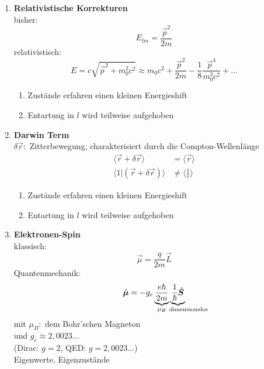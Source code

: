 \begin{enumerate}[1)]
	\item \textbf{Relativistische Korrekturen}\\
	bisher:
	\begin{equation*}
	E_{lm} = \frac{\vec{p}^2}{2m}
	\end{equation*}
	relativistisch:
	\begin{equation*}
	E = c \sqrt{\vec{p}^2 + m_0^2 c^2} \approx m_0 c^2 + \frac{\vec{p}^2}{2m} - \frac{1}{8} \frac{\vec{p}^4}{m_0^3 c^2} + \dots
	\end{equation*}
	\begin{enumerate}[$ \Rightarrow $]
		\item Zustände erfahren einen kleinen Energieshift
		\item Entartung in $ l $ wird teilweise aufgehoben
	\end{enumerate}
	\item \textbf{Darwin Term}\\
	$ \delta \vec{r} : $ Zitterbewegung, charakterisiert durch die Compton-Wellenlänge
	\begin{align*}
	\langle \vec{r} + \delta \vec{r} \rangle &= \langle \vec{r} \rangle \\
	\langle 1 | (\vec{r} + \delta \vec{r}) \rangle &\neq \langle \frac{1}{r} \rangle
	\end{align*}
	\begin{enumerate}[$ \Rightarrow $]
		\item Zustände erfahren einen kleinen Energieshift
		\item Entartung in $ l $ wird teilweise aufgehoben
	\end{enumerate}
	\item \textbf{Elektronen-Spin}\\
	klassisch:
	\begin{equation*}
	\vec{\mu} = \frac{q}{2m} \vec{L}
	\end{equation*}
	Quantenmechanik:
	\begin{equation*}
	\hat{\vec{\mu}} = - g_e \ub{\frac{e \hbar}{2m}}_{\mu_{B}} \ub{\frac{1}{\hbar} \hat{\vec{S}}}_{\mathclap{ \qquad \ \ \tx{dimensionslos}}}
	\end{equation*}
	mit $ \mu_B : $ dem Bohr'schen Magneton\\
	und $ g_e \approx 2{,}0023 \dots $\\
	(Dirac: $ g = 2 $, QED: $ g = 2{,}0023 \dots $)\\[5pt]
	Eigenwerte, Eigenzustände
	\begin{align*}

\end{align*}
\end{enumerate}
